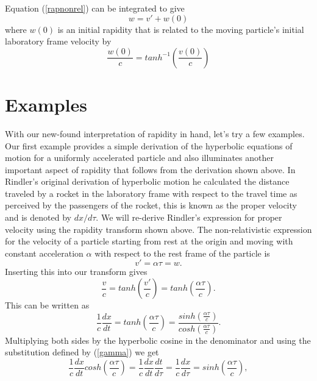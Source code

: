 \documentclass[prb,preprint]{revtex4-1}
\begin{document}
Equation (\ref{rapnonrel}) can be integrated to give
\begin{equation}
\label{rapinit}
w=v'+w\left(0\right)
\end{equation}
where $w\left(0\right)$ is an initial rapidity that is related to the moving particle's initial laboratory frame velocity by 
\begin{equation}
\label{raptanh}
\frac{w\left(0\right)}{c}=tanh^{-1}\left(\frac{v\left(0\right)}{c}\right)
\end{equation}

\section{Examples}

With our new-found interpretation of rapidity in hand, let's try a few examples.  Our first example provides a simple derivation of the hyperbolic equations of motion for a uniformly accelerated particle and also illuminates another important aspect of rapidity that follows from the derivation shown above.  In Rindler's original derivation of hyperbolic motion\cite{rinlderi} he calculated the distance traveled by a rocket in the laboratory frame with respect to the travel time as perceived by the passengers of the rocket, this is known as the proper velocity and is denoted by  $dx/d\tau$.  We will re-derive Rindler's expression for proper velocity using the rapidity transform shown above.  The non-relativistic expression for the velocity of a particle starting from rest at the origin and moving with constant acceleration $\alpha$ with respect to the rest frame of the particle is
\begin{equation}
\label{rindtransformI}
v'=\alpha\tau=w.
\end{equation}
Inserting this into our transform gives
\begin{equation}
\label{transform1}
\frac{v}{c} = tanh\left(\frac{v'}{c}\right)=tanh\left(\frac{\alpha \tau}{c}\right).
\end{equation}
This can be written as
\begin{equation}
\label{rapidityexp}
\frac{1}{c}\frac{dx}{dt} = tanh\left(\frac{\alpha \tau}{c}\right)=\frac{sinh\left(\frac{\alpha \tau}{c}\right)}{cosh\left(\frac{\alpha \tau}{c}\right)}.
\end{equation}
Multiplying both sides by the hyperbolic cosine in the denominator and using the substitution defined by (\ref{gamma}) we get 
\begin{equation}
\frac{1}{c}\frac{dx}{dt}cosh\left(\frac{\alpha \tau}{c}\right) = \frac{1}{c}\frac{dx}{dt}\frac{dt}{d\tau}=\frac{1}{c}\frac{dx}{d\tau}= sinh\left(\frac{\alpha \tau}{c}\right),
\end{equation}
\end{document}
